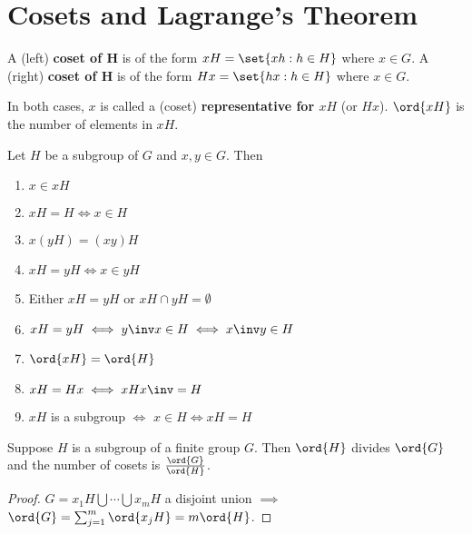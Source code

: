 \chapter{Cosets and Lagrange's Theorem}


\begin{definition}[a coset]
    A (left) \textbf{coset of H} is of the form $xH = \set{xh: h \in H}$ where $x \in G$.
    A (right) \textbf{coset of H} is of the form $Hx = \set{hx: h \in H}$ where $x \in G$.

    In both cases, $x$ is called a (coset) \textbf{representative for $xH$} (or $Hx$). $\ord{xH}$ is the number of elements in $xH$.
\end{definition}

\begin{lemma}
    Let $H$ be a subgroup of $G$ and $x,y \in G$. Then 
    \begin{enumerate}
        \item $x \in xH$
        \item $xH = H \iff x \in H$
        \item $x(yH) = (xy)H$
        \item $xH = yH \iff x \in yH$
        \item Either $xH = yH$ or $xH \cap yH = \emptyset$
        \item $xH = yH \iff y\inv x \in H \iff x\inv y \in H$
        \item $\ord{xH} = \ord{H}$
        \item $xH = Hx \iff xHx\inv = H$
        \item $xH$ is a subgroup $\iff$ $x \in H \iff xH = H$   
    \end{enumerate}
\end{lemma}


\begin{theorem}
    Suppose $H$ is a subgroup of a finite group $G$. Then $\ord{H}$ divides $\ord{G}$ and the number of cosets is $\frac{\ord{G}}{\ord{H}}$.
\end{theorem}
\begin{proof}
    $G = x_1 H \bigcup \cdots \bigcup x_m H$ a disjoint union $\implies$ $\ord{G} = \sum_{j=1}^m \ord{x_j H} = m \ord{H}$.
\end{proof}

